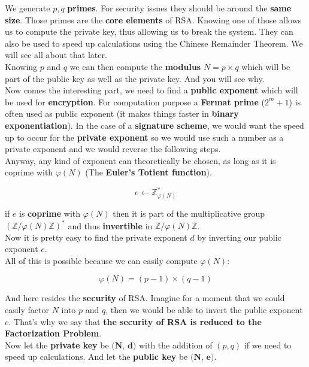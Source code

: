 \documentclass[a4paper,11pt]{article}
\begin{document}
We generate $p, q$ \textbf{primes}. For security issues they should be around the \textbf{same size}. Those primes are the \textbf{core elements} of RSA. Knowing one of those allows us to compute the private key, thus allowing us to break the system. They can also be used to speed up calculations using the Chinese Remainder Theorem. We will see all about that later.\\
Knowing $p$ and $q$ we can then compute the \textbf{modulus} $N = p \times q$ which will be part of the public key as well as the private key. And you will see why.\\

Now comes the interesting part, we need to find a \textbf{public exponent} which will be used for \textbf{encryption}. For computation purpose a \textbf{Fermat prime} ($2^{m} + 1$) is often used as public exponent (it makes things faster in \textbf{binary exponentiation}). In the case of a \textbf{signature scheme}, we would want the speed up to occur for the \textbf{private exponent} so we would use such a number as a private exponent and we would reverse the following steps.\\
Anyway, any kind of exponent can theoretically be chosen, as long as it is coprime with $\varphi(N)$ (The \textbf{Euler's Totient function}).

\[e \leftarrow \mathbb{Z}_{\varphi(N)}^{\ast}\]

if $e$ is \textbf{coprime} with $\varphi(N)$ then it is part of the multiplicative group $(\mathbb{Z}/\varphi(N)\mathbb{Z})^{\ast}$ and thus \textbf{invertible} in $\mathbb{Z}/\varphi(N)\mathbb{Z}$.\\

Now it is pretty easy to find the private exponent $d$ by inverting our public exponent $e$.\\

All of this is possible because we can easily compute $\varphi(N)$:

\[\varphi(N) = (p - 1) \times (q - 1)\]

And here resides the \textbf{security} of RSA. Imagine for a moment that we could easily factor $N$ into $p$ and $q$, then we would be able to invert the public exponent $e$. That's why we say that \textbf{the security of RSA is reduced to the Factorization Problem}.\\

Now let the \textbf{private key} be $\textbf{(N, d)}$ with the addition of $(p, q)$ if we need to speed up calculations.
And let the \textbf{public key} be $\textbf{(N, e)}$.
\end{document}
